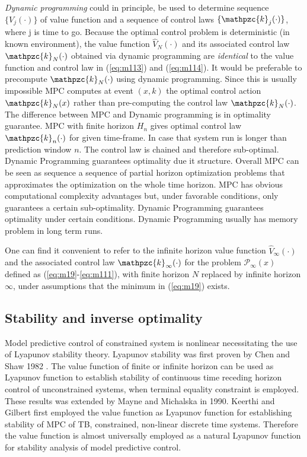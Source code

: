 \noindent \textit{Dynamic programming} could in principle, be used to determine sequence $\{V_j(\cdot)\}$ of value function and a sequence of control laws $\{\mathpzc{k}_j(\cdot)\}$, where j is time to go. Because the optimal control problem is deterministic (in known environment), the value function $\hat{V}_N(\cdot)$ and its associated control law $\mathpzc{k}_N(\cdot)$ obtained via dynamic programming are \textit{identical} to the value function and control law in (\ref{eq:m113}) and (\ref{eq:m114}). It would be preferable to precompute $\mathpzc{k}_N(\cdot)$ using dynamic programming. Since this is usually impossible MPC computes at event $(x,k)$ the optimal control action $\mathpzc{k}_N(x)$ rather than pre-computing the control law $\mathpzc{k}_N(\cdot)$. The difference between MPC and Dynamic programming is in optimality guarantee. MPC with finite horizon $H_n$ gives optimal control law $\mathpzc{k}_n(\cdot)$ for given time-frame. In case that system run is longer than prediction window $n$. The control law is chained and therefore sub-optimal. Dynamic Programming guarantees optimality due it structure. Overall MPC can be seen as sequence a sequence of partial horizon optimization problems that approximates the optimization on the whole time horizon. MPC has obvious computational complexity advantages but, under favorable conditions, only guarantees a certain sub-optimality. Dynamic Programming guarantees optimality under certain conditions. Dynamic Programming usually has memory problem in long term runs.

One can find it convenient to refer to the infinite horizon value function $\hat{V}_\infty(\cdot)$ and the associated control law $\mathpzc{k}_\infty(\cdot)$ for the problem $\mathscr{P}_\infty(x)$ defined as (\ref{eq:m19}-\ref{eq:m111}), with finite horizon $N$ replaced by infinite horizon $\infty$, under assumptions that the minimum in (\ref{eq:m19}) exists.

\subsection{Stability and inverse optimality}
\noindent Model predictive control of constrained system is nonlinear necessitating the use of Lyapunov stability theory. Lyapunov stability was first proven by Chen and Shaw 1982 \cite{chen1982receding}. The value function of finite or infinite horizon can be used as Lyapunov function to establish stability of continuous time receding horizon control of unconstrained systems, when terminal equality constraint is employed. These results was extended by Mayne and Michalska \cite{mayne1990implementable} in 1990. Keerthi and Gilbert  \cite{keerthi1988optimal} first employed the value function as Lyapunov function for establishing stability of MPC of TB, constrained, non-linear discrete time systems. Therefore the value function is almost universally employed as  a natural Lyapunov function for stability analysis of model predictive control.


